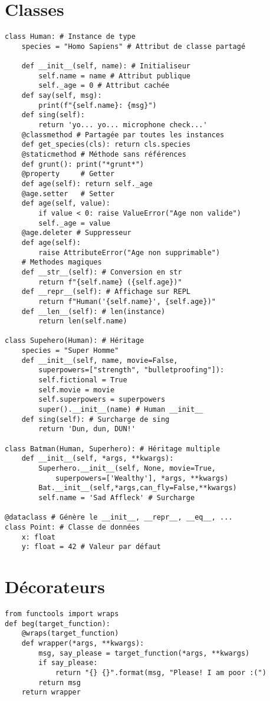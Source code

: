\documentclass{article}
\begin{document}
\begin{multicols*}{4}
\section*{Classes}
\begin{lstlisting}
class Human: # Instance de type
    species = "Homo Sapiens" # Attribut de classe partagé

    def __init__(self, name): # Initialiseur
        self.name = name # Attribut publique
        self._age = 0 # Attribut cachée
    def say(self, msg):
        print(f"{self.name}: {msg}")
    def sing(self):
        return 'yo... yo... microphone check...'
    @classmethod # Partagée par toutes les instances
    def get_species(cls): return cls.species
    @staticmethod # Méthode sans références
    def grunt(): print("*grunt*")
    @property     # Getter
    def age(self): return self._age
    @age.setter   # Setter
    def age(self, value):
        if value < 0: raise ValueError("Age non valide")
        self._age = value
    @age.deleter # Suppresseur
    def age(self):
        raise AttributeError("Age non supprimable")
    # Methodes magiques
    def __str__(self): # Conversion en str
        return f"{self.name} ({self.age})"
    def __repr__(self): # Affichage sur REPL
        return f"Human('{self.name}', {self.age})"
    def __len__(self): # len(instance)
        return len(self.name)

class Supehero(Human): # Héritage
    species = "Super Homme"
    def __init__(self, name, movie=False,
        superpowers=["strength", "bulletproofing"]):
        self.fictional = True
        self.movie = movie
        self.superpowers = superpowers
        super().__init__(name) # Human __init__
    def sing(self): # Surcharge de sing
        return 'Dun, dun, DUN!'

class Batman(Human, Superhero): # Héritage multiple
    def __init__(self, *args, **kwargs):
        Superhero.__init__(self, None, movie=True,
            superpowers=['Wealthy'], *args, **kwargs)
        Bat.__init__(self,*args,can_fly=False,**kwargs)
        self.name = 'Sad Affleck' # Surcharge

@dataclass # Génère le __init__, __repr__, __eq__, ...
class Point: # Classe de données
    x: float
    y: float = 42 # Valeur par défaut
\end{lstlisting}

\section*{Décorateurs}
\begin{lstlisting}
from functools import wraps
def beg(target_function):
    @wraps(target_function)
    def wrapper(*args, **kwargs):
        msg, say_please = target_function(*args, **kwargs)
        if say_please:
            return "{} {}".format(msg, "Please! I am poor :(")
        return msg
    return wrapper


\end{lstlisting}
\end{multicols*}
\end{document}
